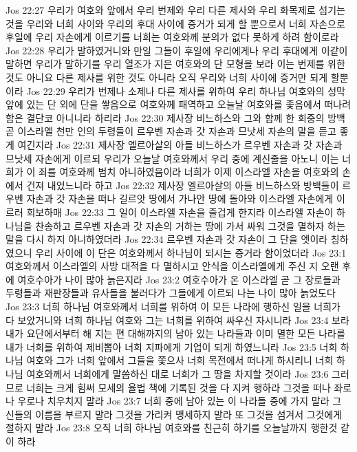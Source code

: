 Jos 22:27  우리가 여호와 앞에서 우리 번제와 우리 다른 제사와 우리 화목제로 섬기는 것을 우리와 너희 사이와 우리의 후대 사이에 증거가 되게 할 뿐으로서 너희 자손으로 후일에 우리 자손에게 이르기를 너희는 여호와께 분의가 없다 못하게 하려 함이로라
Jos 22:28  우리가 말하였거니와 만일 그들이 후일에 우리에게나 우리 후대에게 이같이 말하면 우리가 말하기를 우리 열조가 지은 여호와의 단 모형을 보라 이는 번제를 위한 것도 아니요 다른 제사를 위한 것도 아니라 오직 우리와 너희 사이에 증거만 되게 할뿐이라
Jos 22:29  우리가 번제나 소제나 다른 제사를 위하여 우리 하나님 여호와의 성막 앞에 있는 단 외에 단을 쌓음으로 여호와께 패역하고 오늘날 여호와를 좇음에서 떠나려 함은 결단코 아니니라 하리라
Jos 22:30  제사장 비느하스와 그와 함께 한 회중의 방백 곧 이스라엘 천만 인의 두령들이 르우벤 자손과 갓 자손과 므낫세 자손의 말을 듣고 좋게 여긴지라
Jos 22:31  제사장 엘르아살의 아들 비느하스가 르우벤 자손과 갓 자손과 므낫세 자손에게 이르되 우리가 오늘날 여호와께서 우리 중에 계신줄을 아노니 이는 너희가 이 죄를 여호와께 범치 아니하였음이라 너희가 이제 이스라엘 자손을 여호와의 손에서 건져 내었느니라 하고
Jos 22:32  제사장 엘르아살의 아들 비느하스와 방백들이 르우벤 자손과 갓 자손을 떠나 길르앗 땅에서 가나안 땅에 돌아와 이스라엘 자손에게 이르러 회보하매
Jos 22:33  그 일이 이스라엘 자손을 즐겁게 한지라 이스라엘 자손이 하나님을 찬송하고 르우벤 자손과 갓 자손의 거하는 땅에 가서 싸워 그것을 멸하자 하는 말을 다시 하지 아니하였더라
Jos 22:34  르우벤 자손과 갓 자손이 그 단을 엣이라 칭하였으니 우리 사이에 이 단은 여호와께서 하나님이 되시는 증거라 함이었더라
Jos 23:1  여호와께서 이스라엘의 사방 대적을 다 멸하시고 안식을 이스라엘에게 주신 지 오랜 후에 여호수아가 나이 많아 늙은지라
Jos 23:2  여호수아가 온 이스라엘 곧 그 장로들과 두령들과 재판장들과 유사들을 불러다가 그들에게 이르되 나는 나이 많아 늙었도다
Jos 23:3  너희 하나님 여호와께서 너희를 위하여 이 모든 나라에 행하신 일을 너희가 다 보았거니와 너희 하나님 여호와 그는 너희를 위하여 싸우신 자시니라
Jos 23:4  보라 내가 요단에서부터 해 지는 편 대해까지의 남아 있는 나라들과 이미 멸한 모든 나라를 내가 너희를 위하여 제비뽑아 너희 지파에게 기업이 되게 하였느니라
Jos 23:5  너희 하나님 여호와 그가 너희 앞에서 그들을 쫓으사 너희 목전에서 떠나게 하시리니 너희 하나님 여호와께서 너희에게 말씀하신 대로 너희가 그 땅을 차지할 것이라
Jos 23:6  그러므로 너희는 크게 힘써 모세의 율법 책에 기록된 것을 다 지켜 행하라 그것을 떠나 좌로나 우로나 치우치지 말라
Jos 23:7  너희 중에 남아 있는 이 나라들 중에 가지 말라 그 신들의 이름을 부르지 말라 그것을 가리켜 맹세하지 말라 또 그것을 섬겨서 그것에게 절하지 말라
Jos 23:8  오직 너희 하나님 여호와를 친근히 하기를 오늘날까지 행한것 같이 하라
